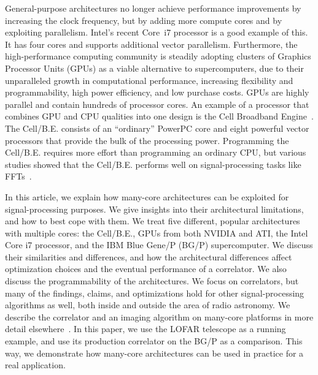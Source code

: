 \documentclass{article}
\begin{document}
General-purpose architectures no longer
achieve performance improvements by increasing the clock frequency, but
by adding more compute cores and by exploiting parallelism.  Intel's
recent Core~i7 processor is a good example of this. It has four
cores and supports additional vector parallelism.
Furthermore, the high-performance computing community is
steadily adopting clusters of Graphics Processor Units (GPUs) as a viable
alternative to supercomputers, due to their unparalleled growth in
computational performance, increasing flexibility and programmability,
high power efficiency, and low purchase costs.
GPUs are highly parallel and contain hundreds of processor cores.
An example of a processor that combines GPU and CPU
qualities into one design is the Cell Broadband Engine~\cite{cell}.
The \mbox{Cell/B.E.} consists of an ``ordinary'' PowerPC core and eight powerful
vector processors that provide the bulk of the processing power.
Programming the \mbox{Cell/B.E.} requires more effort than programming an ordinary CPU,
but various studies showed that the \mbox{Cell/B.E.} performs well on
signal-processing tasks like FFTs~\cite{fftc}.

In this article, we explain how many-core architectures can be
exploited for signal-processing purposes.  We give
insights into their architectural limitations, and how to best cope
with them.  We treat five different, popular architectures with
multiple cores: the \mbox{Cell/B.E.}, GPUs from both NVIDIA and ATI, the Intel Core i7 processor, and
the IBM Blue Gene/P (BG/P) supercomputer.  We discuss their
similarities and differences, and how the architectural differences
affect optimization choices and the eventual performance of a
correlator. We also discuss the programmability of the architectures.
We focus on correlators, but many of the
findings, claims, and optimizations hold for other signal-processing
algorithms as well, both inside and outside the area of radio astronomy.
We describe the correlator and an imaging algorithm on many-core
platforms in more detail elsewhere~\cite{Nieuwpoort:09,gridding}. 
In this paper, we use the LOFAR telescope as a running example, and
use its production correlator on the BG/P as a comparison. This way,
we demonstrate how many-core architectures can be used in practice for a real
application.
\end{document}
